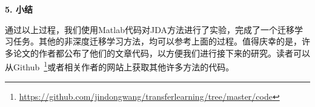 \textbf{5. 小结}

通过以上过程，我们使用Matlab代码对JDA方法进行了实验，完成了一个迁移学习任务。其他的非深度迁移学习方法，均可以参考上面的过程。值得庆幸的是，许多论文的作者都公布了他们的文章代码，以方便我们进行接下来的研究。读者可以从Github~\footnote{\url{https://github.com/jindongwang/transferlearning/tree/master/code}}或者相关作者的网站上获取其他许多方法的代码。

%
%
